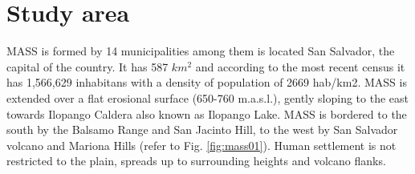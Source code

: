 \documentclass[11pt,twoside]{rmta2010esp}%
\begin{document}
\section{Study area}
\label{sec:studyarea}
MASS is formed by 14 municipalities among them is located San Salvador, the capital of the country. It has 587 $km^{2}$ and according to the most recent census \cite{minecon} it has 1,566,629 inhabitans with a density of population of 2669 hab/km2. MASS is extended over a flat erosional surface (650-760 m.a.s.l.), gently sloping to the east towards Ilopango Caldera also known as Ilopango Lake. MASS is bordered to the south by the Balsamo Range and San Jacinto Hill, to the west by San Salvador volcano and Mariona Hills (refer to Fig. \ref{fig:mass01}). Human settlement is not restricted to the plain, spreads up to surrounding heights and volcano flanks.
\end{document}
